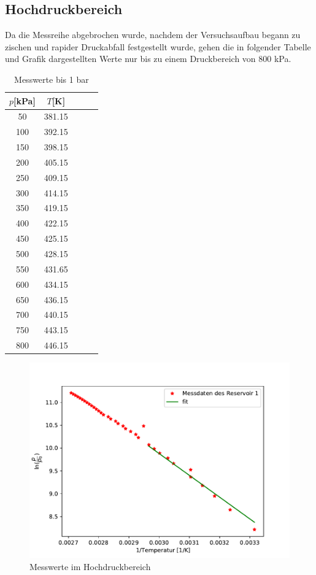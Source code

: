 \subsection{Hochdruckbereich}
  Da die Messreihe abgebrochen wurde, nachdem der Versuchsaufbau begann zu zischen 
  und rapider Druckabfall festgestellt wurde, gehen die in folgender Tabelle und Grafik dargestellten 
  Werte nur bis zu einem Druckbereich von 800 kPa.
  \begin{table}[H]
    \centering
     \caption{Messwerte bis 1 bar}
     \label{tab:data}
     \begin{tabular}{c c c c c}
     \toprule
     $p$[kPa] & $T$[K] \\
      \midrule
      50 &   381.15 \\ 
      100 &   392.15 \\ 
      150 &   398.15 \\ 
      200 &   405.15 \\ 
      250 &   409.15 \\ 
      300 &   414.15 \\ 
      350 &   419.15 \\ 
      400 &   422.15 \\ 
      450 &   425.15 \\ 
      500 &   428.15 \\ 
      550 &   431.65 \\ 
      600 &   434.15 \\ 
      650 &   436.15 \\ 
      700 &   440.15 \\ 
      750 &   443.15 \\ 
      800 &   446.15 \\ 
     \bottomrule
    \end{tabular}
  \end{table}
  \begin{figure}[H]
   \centering
   \includegraphics{plot1.pdf}
   \caption{Messwerte im Hochdruckbereich}
   \label{fig:plot1}
  \end{figure}

